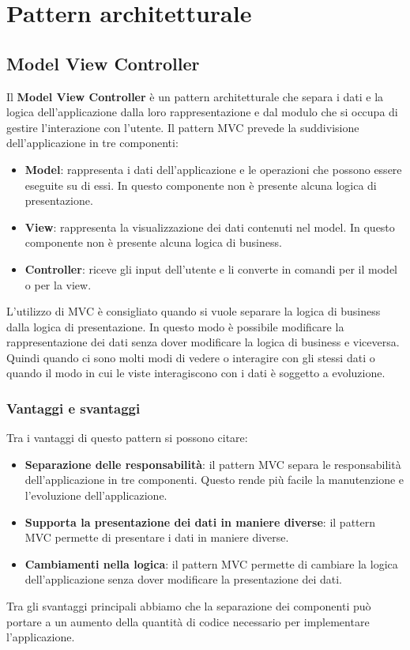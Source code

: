 \section{Pattern architetturale}

\subsection{Model View Controller}
Il \textbf{Model View Controller} è un pattern architetturale che separa i dati e la logica
dell'applicazione dalla loro rappresentazione e dal modulo che si occupa di gestire 
l'interazione con l'utente. Il pattern MVC prevede la suddivisione dell'applicazione
in tre componenti:
\begin{itemize}
  \item \textbf{Model}: rappresenta i dati dell'applicazione e le operazioni che possono essere
  eseguite su di essi. In questo componente non è presente alcuna logica di presentazione.
  \item \textbf{View}: rappresenta la visualizzazione dei dati contenuti nel model. In questo
  componente non è presente alcuna logica di business.
  \item \textbf{Controller}: riceve gli input dell'utente e li converte in comandi per il model
  o per la view.
\end{itemize}

L'utilizzo di MVC è consigliato quando si vuole separare la logica di business dalla
logica di presentazione. In questo modo è possibile modificare la rappresentazione
dei dati senza dover modificare la logica di business e viceversa. 
Quindi quando ci sono molti modi di vedere o interagire con gli stessi dati o quando il 
modo in cui le viste interagiscono con i dati è soggetto a evoluzione.

\subsubsection{Vantaggi e svantaggi}
Tra i vantaggi di questo pattern si possono citare:
\begin{itemize}
    \item \textbf{Separazione delle responsabilità}: il pattern MVC separa le responsabilità
    dell'applicazione in tre componenti. Questo rende più facile la manutenzione e l'evoluzione
    dell'applicazione.
    \item \textbf{Supporta la presentazione dei dati in maniere diverse}: il pattern MVC
    permette di presentare i dati in maniere diverse.
    \item \textbf{Cambiamenti nella logica}: il pattern MVC permette di cambiare la logica
    dell'applicazione senza dover modificare la presentazione dei dati.
\end{itemize}
Tra gli svantaggi principali abbiamo che la separazione dei componenti
può portare a un aumento
della quantità di codice necessario per implementare l'applicazione.
